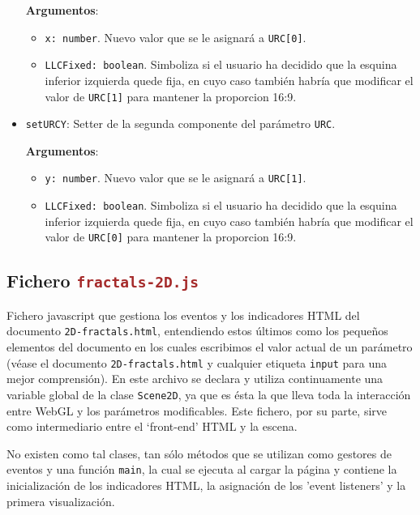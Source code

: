 \begin{itemize}
    \textbf{Argumentos}:
    
    \begin{itemize}
        \item \verb|x: number|. Nuevo valor que se le asignará a \verb|URC[0]|.
        \item \verb|LLCFixed: boolean|. Simboliza si el usuario ha decidido que la esquina inferior izquierda quede fija, en cuyo caso también habría que modificar el valor de \verb|URC[1]| para mantener la proporcion 16:9.
    \end{itemize}
    \item \verb|setURCY|: Setter de la segunda componente del parámetro \verb|URC|.
    
    \textbf{Argumentos}:
    
    \begin{itemize}
        \item \verb|y: number|. Nuevo valor que se le asignará a \verb|URC[1]|.
        \item \verb|LLCFixed: boolean|. Simboliza si el usuario ha decidido que la esquina inferior izquierda quede fija, en cuyo caso también habría que modificar el valor de \verb|URC[0]| para mantener la proporcion 16:9.
    \end{itemize}

\end{itemize}

\subsection{Fichero \Large\texttt{\textcolor{brown}{fractals-2D.js}}}

Fichero javascript que gestiona los eventos y los indicadores HTML del documento \verb|2D-fractals.html|, entendiendo estos últimos como los pequeños elementos del documento en los cuales escribimos el valor actual de un parámetro (véase el documento \verb|2D-fractals.html| y cualquier etiqueta \verb|input| para una mejor comprensión). En este archivo se declara y utiliza continuamente una variable global de la clase \verb|Scene2D|, ya que es ésta la que lleva toda la interacción entre WebGL y los parámetros modificables. Este fichero, por su parte, sirve como intermediario entre el `front-end' HTML y la escena.

No existen como tal clases, tan sólo métodos que se utilizan como gestores de eventos y una función \verb|main|, la cual se ejecuta al cargar la página y contiene la inicialización de los indicadores HTML, la asignación de los 'event listeners' y la primera visualización.

